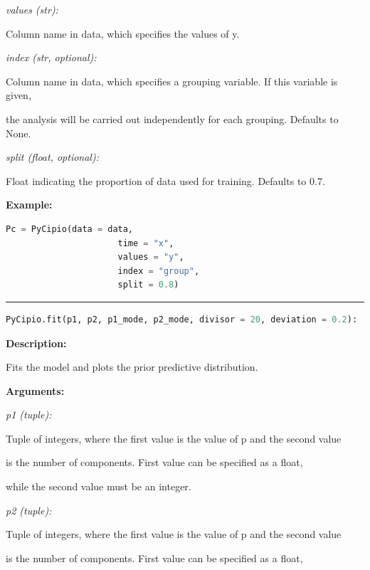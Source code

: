 \documentclass{article}
\begin{document}
\indent \indent \textit{values (str):} 

\indent \indent \indent Column name in data, which specifies the values of y.
            
\indent \indent \textit{index (str, optional):} 

\indent \indent \indent Column name in data, which specifies a grouping variable. If this variable is given, 

\indent \indent \indent the analysis will be carried out independently for each grouping. Defaults to None.

\indent \indent \textit{split (float, optional):} 

\indent \indent \indent Float indicating the proportion of data used for training. Defaults to 0.7.


\indent \textbf{Example:}
\begin{lstlisting}[language=Python]
		 Pc = PyCipio(data = data, 
                      time = "x", 
                      values = "y", 
                      index = "group", 
                      split = 0.8)

\end{lstlisting}

\hrule

\begin{lstlisting}[language=Python]
    PyCipio.fit(p1, p2, p1_mode, p2_mode, divisor = 20, deviation = 0.2):
\end{lstlisting}

\indent \textbf{Description:} 

\indent \indent Fits the model and plots the prior predictive distribution.

\indent \textbf{Arguments:}

\indent \indent \textit{p1 (tuple):} 

\indent \indent \indent Tuple of integers, where the first value is the value of p and the second value

\indent \indent \indent is the number of components. First value can be specified as a float, 

\indent \indent \indent while the second value must be an integer.

\indent \indent \textit{p2 (tuple):} 

\indent \indent \indent Tuple of integers, where the first value is the value of p and the second value

\indent \indent \indent is the number of components. First value can be specified as a float, 
\end{document}
